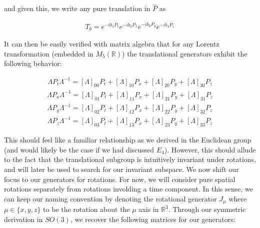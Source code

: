 \documentclass[10pt]{ucthesis}
\newcommand{\R}{\mathbb{R}}
\begin{document}
and given this, we write any pure translation in $\overset{\sim}{P}$ as 

\begin{equation}
\begin{aligned}
	T_b = e^{-ib_1P_t}e^{-ib_2P_x}e^{-ib_3P_y}e^{-ib_4P_z}
\end{aligned}
\end{equation}

It can then be easily verified with matrix algebra that for any Lorentz transformation (embedded in $M_5(\R)$) the translational generators exhibit the following behavior:

\begin{equation}
\begin{aligned}
	\Lambda P_t \Lambda^{-1} = [\Lambda]_{00}P_t + [\Lambda]_{10}P_x + [\Lambda]_{20}P_y + [\Lambda]_{30}P_z
\end{aligned}
\end{equation}
\begin{equation}
\begin{aligned}
	\Lambda P_x \Lambda^{-1} = [\Lambda]_{01}P_t + [\Lambda]_{11}P_x + [\Lambda]_{21}P_y + [\Lambda]_{31}P_z
\end{aligned}
\end{equation}
\begin{equation}
\begin{aligned}
	\Lambda P_y \Lambda^{-1} = [\Lambda]_{02}P_t + [\Lambda]_{12}P_x + [\Lambda]_{22}P_y + [\Lambda]_{32}P_z
\end{aligned}
\end{equation}
\begin{equation}
\begin{aligned}
	\Lambda P_z \Lambda^{-1} = [\Lambda]_{03}P_t + [\Lambda]_{13}P_x + [\Lambda]_{23}P_y + [\Lambda]_{33}P_z
\end{aligned}
\end{equation}

This should feel like a familiar relationship as we derived in the Euclidean group (and would likely be the case if we had discussed $E_4$). However, this should allude to the fact that the translational subgroup is intuitively invariant under rotations, and will later be used to search for our invariant subspace. We now shift our focus to our generators for rotations. For now, we will consider pure spatial rotations separately from rotations involding a time component. In this sense, we can keep our naming convention by denoting the rotational generator $J_\mu$ where $\mu\in\{x,y,z\}$ to be the rotation about the $\mu$ axis in $\R^3$. Through our symmetric derivation in $SO(3)$, we recover the following matrices for our generators:
\end{document}
